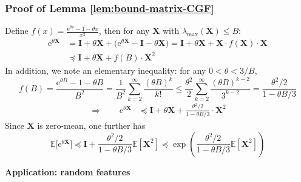 \documentclass[compress,
mathserif,wide,%
]{beamer}
\begin{document}
\begin{frame}
\frametitle{Proof of Lemma \ref{lem:bound-matrix-CGF}} 

{\small

Define $f(x)=\frac{\mathrm{e}^{\theta x}-1-\theta x}{x^{2}}$, then
for any $\bm{X}$ with $\lambda_{\max}(\bm{X})\leq B$:
\begin{align*}
\mathrm{e}^{\theta\bm{X}} & =\bm{I}+\theta\bm{X}+\big(\mathrm{e}^{\theta\bm{X}}-\bm{I}-\theta\bm{X}\big)=\bm{I}+\theta\bm{X}+\bm{X}\cdot f(\bm{X})\cdot\bm{X}\\
 & \preceq\bm{I}+\theta\bm{X}+f(B)\cdot\bm{X}^{2}
\end{align*}
In addition, we note an elementary inequality: for any $0<\theta<3/B$,
%
\[
f(B)=\frac{\mathrm{e}^{\theta B}-1-\theta B}{B^{2}}=\frac{1}{B^{2}}\sum_{k=2}^{\infty}\frac{(\theta B)^{k}}{k!}\leq\frac{\theta^{2}}{2}\sum_{k=2}^{\infty}\frac{(\theta B)^{k-2}}{3^{k-2}}=\frac{\theta^{2}/2}{1-\theta B/3}
\]
%
\begin{align*}
	\Longrightarrow \qquad \mathrm{e}^{\theta\bm{X}} & \preceq\bm{I}+\theta\bm{X}+\frac{\theta^{2}/2}{1-\theta B/3}\cdot\bm{X}^{2}
\end{align*}
%
Since $\bm{X}$ is zero-mean, one further has
\[
\mathbb{E}\big[\mathrm{e}^{\theta\bm{X}}\big]\preceq\bm{I}+\frac{\theta^{2}/2}{1-\theta B/3}\mathbb{E}[\bm{X}^{2}]\preceq\exp\left(\frac{\theta^{2}/2}{1-\theta B/3}\mathbb{E}[\bm{X}^{2}]\right)
\]

}

\end{frame}





\begin{frame}[plain]

\vfill
\begin{center}
  {\Large\bf Application: random features}
\end{center}

\vfill

\end{frame}
\end{document}
